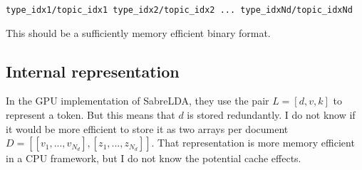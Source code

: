 \documentclass{article}
\begin{document}
\bigskip

\texttt{type\_idx1/topic\_idx1 type\_idx2/topic\_idx2 ... type\_idxNd/topic\_idxNd}

\bigskip

This should be a sufficiently memory efficient binary format.

\subsection{Internal representation}

In the GPU implementation of SabreLDA, they use the pair $L = [d, v, k]$ to represent a token. But this means that $d$ is stored redundantly. I do not know if it would be more efficient to store it as two arrays per document $D = [[v_1, ..., v_{N_d}], [z_1, ..., z_{N_d}]]$. That representation is more memory efficient in a CPU framework, but I do not know the potential cache effects.
\end{document}
